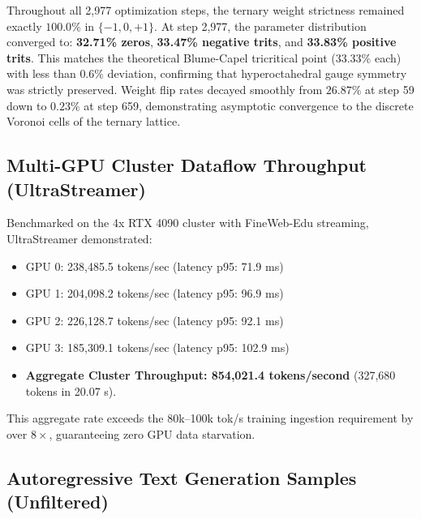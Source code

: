 \documentclass[11pt,a4paper]{article}
\begin{document}
Throughout all 2,977 optimization steps, the ternary weight strictness remained exactly $100.0\%$ in $\{-1, 0, +1\}$. At step 2,977, the parameter distribution converged to:
\textbf{32.71\% zeros}, \textbf{33.47\% negative trits}, and \textbf{33.83\% positive trits}. This matches the theoretical Blume-Capel tricritical point (33.33\% each) with less than $0.6\%$ deviation, confirming that hyperoctahedral gauge symmetry was strictly preserved. Weight flip rates decayed smoothly from $26.87\%$ at step 59 down to $0.23\%$ at step 659, demonstrating asymptotic convergence to the discrete Voronoi cells of the ternary lattice.

\subsection{Multi-GPU Cluster Dataflow Throughput (UltraStreamer)}

Benchmarked on the 4x RTX 4090 cluster with FineWeb-Edu streaming, UltraStreamer demonstrated:
\begin{itemize}
    \item GPU 0: 238,485.5 tokens/sec (latency p95: 71.9 ms)
    \item GPU 1: 204,098.2 tokens/sec (latency p95: 96.9 ms)
    \item GPU 2: 226,128.7 tokens/sec (latency p95: 92.1 ms)
    \item GPU 3: 185,309.1 tokens/sec (latency p95: 102.9 ms)
    \item \textbf{Aggregate Cluster Throughput: 854,021.4 tokens/second} (327,680 tokens in 20.07 s).
\end{itemize}
This aggregate rate exceeds the 80k--100k tok/s training ingestion requirement by over $8\times$, guaranteeing zero GPU data starvation.

\subsection{Autoregressive Text Generation Samples (Unfiltered)}
\end{document}
